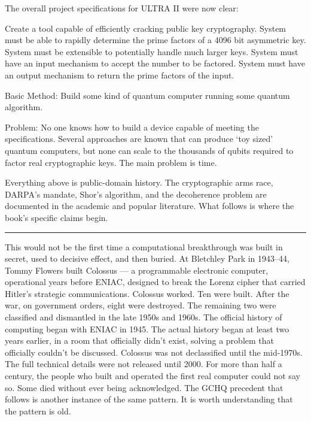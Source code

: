 The overall project specifications for ULTRA II were now clear:

Create a tool capable of efficiently cracking public key cryptography.   System must be able to rapidly determine the prime factors of a 4096 bit asymmetric key.  System must be extensible to potentially handle much larger keys.  System must have an input mechanism to accept the number to be factored.  System must have an output mechanism to return the prime factors of the input.

Basic Method: Build some kind of quantum computer running some quantum algorithm.

Problem: No one knows how to build a device capable of meeting the specifications.  Several approaches are known that can produce `toy sized' quantum computers, but none can scale to the thousands of qubits required to factor real cryptographic keys.  The main problem is  time.

Everything above is public-domain history. The cryptographic arms race, DARPA's mandate, Shor's algorithm, and the decoherence problem are documented in the academic and popular literature. What follows is where the book's specific claims begin.

\vspace{1cm}\noindent\rule{0.5\textwidth}{0.5pt}\vspace{0.5cm}

This would not be the first time a computational breakthrough was built in secret, used to decisive effect, and then buried. At Bletchley Park in 1943--44, Tommy Flowers built Colossus --- a programmable electronic computer, operational years before ENIAC, designed to break the Lorenz cipher that carried Hitler's strategic communications. Colossus worked. Ten were built. After the war, on government orders, eight were destroyed. The remaining two were classified and dismantled in the late 1950s and 1960s. The official history of computing began with ENIAC in 1945. The actual history began at least two years earlier, in a room that officially didn't exist, solving a problem that officially couldn't be discussed. Colossus was not declassified until the mid-1970s. The full technical details were not released until 2000. For more than half a century, the people who built and operated the first real computer could not say so. Some died without ever being acknowledged. The GCHQ precedent that follows is another instance of the same pattern. It is worth understanding that the pattern is old.

